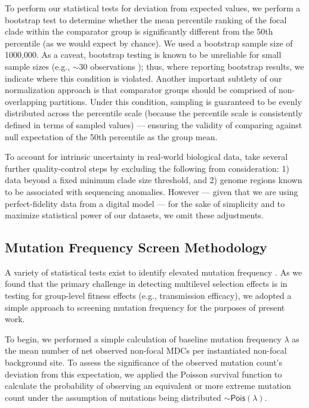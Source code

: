 To perform our statistical tests for deviation from expected values, we perform a bootstrap test to determine whether the mean percentile ranking of the focal clade within the comparator group is significantly different from the 50th percentile (as we would expect by chance).
We used a bootstrap sample size of 1000,000.
As a caveat, bootstrap testing is known to be unreliable for small sample sizes (e.g., $\sim30$ observations \citep{Efron1994}); thus, where reporting bootstrap results, we indicate where this condition is violated.
Another important subtlety of our normalization approach is that comparator groups should be comprised of non-overlapping partitions.
Under this condition, sampling is guaranteed to be evenly distributed across the percentile scale (because the percentile scale is consistently defined in terms of sampled values) --- ensuring the validity of comparing against null expectation of the 50th percentile as the group mean.

To account for intrinsic uncertainty in real-world biological data,
\citet{BonettiFranceschi2024phylogenetic} take several further quality-control steps by excluding the following from consideration: 1) data beyond a fixed minimum clade size threshold, and 2) genome regions known to be associated with sequencing anomalies.
However --- given that we are using perfect-fidelity data from a digital model --- for the sake of simplicity and to maximize statistical power of our datasets, we omit these adjustments.

\subsection{Mutation Frequency Screen Methodology}

A variety of statistical tests exist to identify elevated mutation frequency \citep{mcdonaldAdaptiveProteinEvolution1991, narumComparisonFSTOutlier2011, yangStatisticalPropertiesBranchSite2011}.
As we found that the primary challenge in detecting multilevel selection effects is in testing for group-level fitness effects (e.g., transmission efficacy), we adopted a simple approach to screening mutation frequency for the purposes of present work.

To begin, we performed a simple calculation of baseline mutation frequency $\lambda$ as the mean number of net observed non-focal MDCs per instantiated non-focal background site.
To assess the significance of the observed mutation count's deviation from this expectation, we applied the Poisson survival function to calculate the probability of observing an equivalent or more extreme mutation count under the assumption of mutations being distributed $\sim \mathsf{Pois}(\lambda)$.

